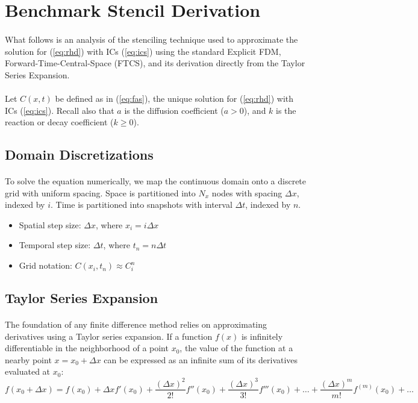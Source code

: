 \section{Benchmark Stencil Derivation}
\paragraph{}
What follows is an analysis of the stenciling technique used to approximate the solution for (\ref{eq:rhd}) with ICs (\ref{eq:ics}) using the standard Explicit FDM, Forward-Time-Central-Space (FTCS), and its derivation directly from the Taylor Series Expansion.
\paragraph{}
Let $C(x,t)$ be defined as in (\ref{eq:fas}), the unique solution for (\ref{eq:rhd}) with ICs (\ref{eq:ics}). Recall also that $a$ is the diffusion coefficient ($a > 0$), and $k$ is the reaction or decay coefficient ($k \geq 0$). 

\subsection*{Domain Discretizations}
\paragraph{}
To solve the equation numerically, we map the continuous domain onto a discrete grid with uniform spacing. Space is partitioned into $N_x$ nodes with spacing $\Delta x$, indexed by $i$. Time is partitioned into snapshots with interval $\Delta t$, indexed by $n$.
\begin{itemize}
\item[] Spatial step size: $\Delta x$, where $x_i = i\Delta x$
\item[] Temporal step size: $\Delta t$, where $t_n = n\Delta t$
\item[] Grid notation: $C(x_i, t_n) \approx C_i^n$
\end{itemize}

\subsection*{Taylor Series Expansion}
\paragraph{}
The foundation of any finite difference method relies on approximating derivatives using a Taylor series expansion. If a function $f(x)$ is infinitely differentiable in the neighborhood of a point $x_0$, the value of the function at a nearby point $x = x_0 + \Delta x$ can be expressed as an infinite sum of its derivatives evaluated at $x_0$:
\begin{equation}
\label{eq:tsee}
f(x_0 + \Delta x) = f(x_0) + \Delta x f'(x_0) + \frac{(\Delta x)^2}{2!} f''(x_0) + \frac{(\Delta x)^3}{3!} f'''(x_0) + \dots + \frac{(\Delta x)^m}{m!} f^{(m)}(x_0) + \dots
\end{equation}
